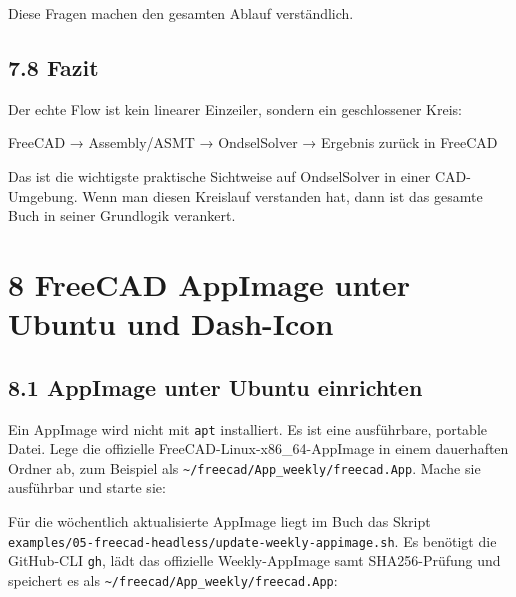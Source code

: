 \documentclass[
  12pt
]{book}
\newenvironment{Shaded}{}{}
\newcommand{\AttributeTok}[1]{\textcolor[rgb]{0.49,0.56,0.16}{#1}}
\newcommand{\FunctionTok}[1]{\textcolor[rgb]{0.02,0.16,0.49}{#1}}
\newcommand{\NormalTok}[1]{#1}
\newcommand{\StringTok}[1]{\textcolor[rgb]{0.25,0.44,0.63}{#1}}
\newcommand{\VariableTok}[1]{\textcolor[rgb]{0.10,0.09,0.49}{#1}}
\begin{document}
Diese Fragen machen den gesamten Ablauf verständlich.

\hypertarget{fazit-5}{%
\section{\texorpdfstring{{7.8} Fazit}{7.8 Fazit}}\label{fazit-5}}

Der echte Flow ist kein linearer Einzeiler, sondern ein geschlossener
Kreis:

FreeCAD → Assembly/ASMT → OndselSolver → Ergebnis zurück in FreeCAD

Das ist die wichtigste praktische Sichtweise auf OndselSolver in einer
CAD-Umgebung. Wenn man diesen Kreislauf verstanden hat, dann ist das
gesamte Buch in seiner Grundlogik verankert.

\hypertarget{kap-freecad-app}{%
\chapter{\texorpdfstring{{8} FreeCAD AppImage unter Ubuntu und
Dash-Icon}{8 FreeCAD AppImage unter Ubuntu und Dash-Icon}}\label{kap-freecad-app}}

\hypertarget{appimage-unter-ubuntu-einrichten}{%
\section{\texorpdfstring{{8.1} AppImage unter Ubuntu
einrichten}{8.1 AppImage unter Ubuntu einrichten}}\label{appimage-unter-ubuntu-einrichten}}

Ein AppImage wird nicht mit \texttt{apt} installiert. Es ist eine
ausführbare, portable Datei. Lege die offizielle
FreeCAD-Linux-x86\_64-AppImage in einem dauerhaften Ordner ab, zum
Beispiel als \texttt{\textasciitilde{}/freecad/App\_weekly/freecad.App}.
Mache sie ausführbar und starte sie:

\begin{Shaded}
\end{Shaded}

Für die wöchentlich aktualisierte AppImage liegt im Buch das Skript
\texttt{examples/05-freecad-headless/update-weekly-appimage.sh}. Es
benötigt die GitHub-CLI \texttt{gh}, lädt das offizielle Weekly-AppImage
samt SHA256-Prüfung und speichert es als
\texttt{\textasciitilde{}/freecad/App\_weekly/freecad.App}:
\end{document}
